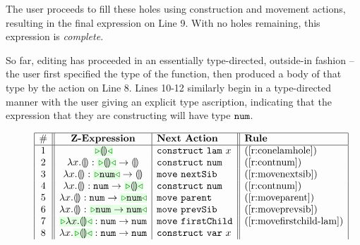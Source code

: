 The
user proceeds to fill these holes using construction and movement actions, resulting in the final expression on Line 9. With no holes remaining, this expression is \emph{complete}.%

So far, editing has proceeded in an essentially type-directed, outside-in fashion -- the user first specified the type of the function, then produced a body of that type by the action on Line 8. Lines 10-12 similarly begin in a type-directed manner with the user giving an explicit type ascription, indicating that the expression that they are constructing will have type $\texttt{num}$. 



\begin{figure}[t!]
\[
\begin{array}{|c||c|l||l|l|}
\hline
\# & \textbf{Z-Expression} & 
\textbf{Next Action} & \textbf{Rule}
\\
\hline
1 &
\zwsel{\hhole{}} & 
\aConstruct{\flam{x}} & 
\text{(\ref{r:conelamhole})}
\\ 2 &
\hlam{x}{\hhole{}} : \tarr{\zwsel{\hhole{}}}{\hhole{}} & 
\aConstruct{\fnum{}} &
\text{(\ref{r:contnum})}
\\ 3 &
\hlam{x}{\hhole{}} : \tarr{\zwsel{\tnum{}}}{\hhole{}} &
\aMove{\dNext{}} & 
\text{({\ref{r:movenextsib}})}
\\ 4 &
\hlam{x}{\hhole{}} : \tarr{\tnum}{\zwsel{\hhole{}}}
&
\aConstruct{\fnum{}} & 
\text{(\ref{r:contnum})}
\\ 5 &
\hlam{x}{\hhole{}} : \tarr{\tnum{}}{\zwsel{\tnum{}}} & 
\aMove{\dParent{}} & 
\text{(\ref{r:moveparent})}
\\ 6 &
\hlam{x}{\hhole{}} : \zwsel{\tarr{\tnum{}}{\tnum{}}}
&
\aMove{\dPrev{}} & 
\text{(\ref{r:moveprevsib})}
\\ 7 &
\zwsel{\hlam{x}{\hhole{}}} : \tarr{\tnum{}}{\tnum{}} & 
\aMove{\dChild{}} & 
\text{(\ref{r:movefirstchild-lam})}
\\ 8 &
\hlam{x}{\zwsel{\hhole{}}} : \tarr{\tnum{}}{\tnum{}} &
\aConstruct{\fvar{x}} & 

\end{array}\]
\end{figure}
